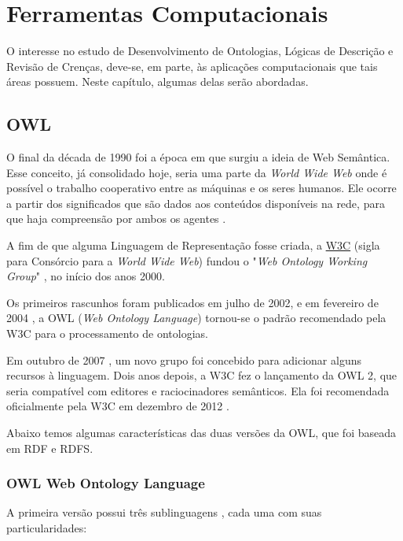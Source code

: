 \chapter{Ferramentas Computacionais}

\lettrine{O}{} interesse no estudo de Desenvolvimento de Ontologias, Lógicas de Descrição e Revisão de Crenças, deve-se, em parte, às aplicações computacionais que tais áreas possuem. Neste capítulo, algumas delas serão abordadas.

\section{OWL}

O final da década de 1990 foi a época em que surgiu a ideia de Web Semântica. Esse conceito, já consolidado hoje, seria uma parte da \textit{World Wide Web} onde é possível o trabalho cooperativo entre as máquinas e os seres humanos. Ele ocorre a partir dos significados que são dados aos conteúdos disponíveis na rede, para que haja compreensão por ambos os agentes \cite{ferramentasHerman}.

A fim de que alguma Linguagem de Representação fosse criada, a \href{https://www.w3.org}{W3C} (sigla para Consórcio para a \textit{World Wide Web}) fundou o "\textit{Web Ontology Working Group}" \cite{ferramentasGrupo}, no início dos anos 2000. 

Os primeiros rascunhos foram publicados em julho de 2002, e em fevereiro de 2004 \cite{ferramentasReco}, a OWL (\textit{Web Ontology Language}) tornou-se o padrão recomendado pela W3C para o processamento de ontologias.

Em outubro de 2007 \cite{ferramentasOWLGrupo2}, um novo grupo foi concebido para adicionar alguns recursos à linguagem. Dois anos depois, a W3C fez o lançamento da OWL 2, que seria compatível com editores e raciocinadores semânticos. Ela foi recomendada oficialmente pela W3C em dezembro de 2012 \cite{ferramentasOWLReco2}.

Abaixo temos algumas características das duas versões da OWL, que foi baseada em RDF e RDFS.

\subsection{OWL Web Ontology Language}

A primeira versão possui três sublinguagens \cite{ferramentasOWL1}, cada uma com suas particularidades:


